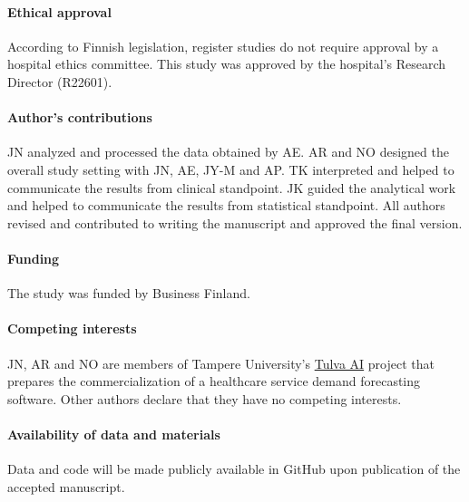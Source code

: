 \paragraph{Ethical approval} According to Finnish legislation, register studies do not require approval by a hospital ethics committee. This study was approved by the hospital’s Research Director (R22601).

\paragraph{Author's contributions} JN analyzed and processed the data obtained by AE. AR and NO designed the overall study setting with JN, AE, JY-M and AP. TK interpreted and helped to communicate the results from clinical standpoint. JK guided the analytical work and helped to communicate the results from statistical standpoint. All authors revised and contributed to writing the manuscript and approved the final version.

\paragraph{Funding} The study was funded by Business Finland.

\paragraph{Competing interests} JN, AR and NO are members of Tampere University's \href{www.tulva.ai}{Tulva AI} project that prepares the commercialization of a healthcare service demand forecasting software. Other authors declare that they have no competing interests.

\paragraph{Availability of data and materials} Data and code will be made publicly available in GitHub upon publication of the accepted manuscript.